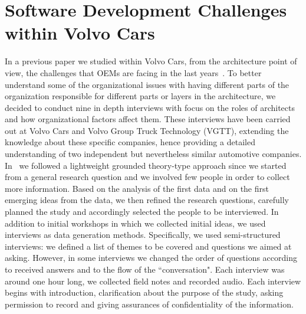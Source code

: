 \section{Software Development Challenges within Volvo Cars}\label{sec:lessonsLearned}

In a previous paper we studied within Volvo Cars,
from the architecture point of view,
the challenges that OEMs are facing in the last years~\cite{WICSA2015}. 
To better understand some of the
organizational issues with having different parts of the organization responsible for different parts or layers in the architecture, we decided to conduct nine in depth interviews with
focus on the roles of architects and how organizational factors affect them.
These interviews have been carried out at Volvo Cars  and Volvo Group Truck Technology
(VGTT), extending the knowledge about these specific companies, hence providing a detailed understanding of two independent but nevertheless similar automotive companies. %
In~\cite{WICSA2015} we 
followed a lightweight grounded theory-type approach since we started from a general research question and we involved few people in order to collect more information. Based on the analysis of the first data and on the first emerging ideas from the data, we then refined the research questions, carefully planned the study and accordingly selected the people to be interviewed. 
In addition to initial workshops in which we collected initial ideas, we used interviews as data generation methods. Specifically, we used semi-structured interviews: we defined a list of themes to be covered and questions we aimed at asking. However, in some interviews we changed the order of questions according to received answers and to the flow of the ``conversation". 
Each interview was around one hour long, we collected field notes and recorded audio. Each interview begins with introduction, clarification about the purpose of the study, asking permission to record and giving assurances of confidentiality of the information.  


